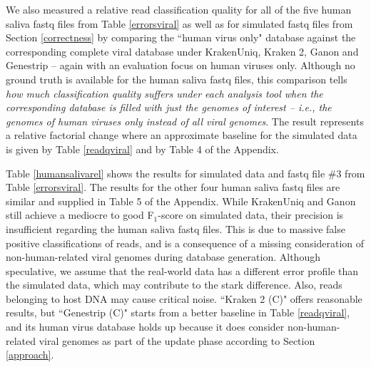 \documentclass[pdflatex,sn-vancouver-num]{sn-jnl}
\begin{document}
    We also measured a relative read classification quality for all of the five human saliva fastq files from Table \ref{errorsviral} as well as for simulated fastq files from Section \ref{correctness} by comparing the ``human virus only" database against the corresponding complete viral database under KrakenUniq, Kraken 2, Ganon and Genestrip -- again with an evaluation focus on human viruses only.
    Although no ground truth is available for the human saliva fastq files, this comparison tells \emph{how much classification quality suffers under each analysis tool when the corresponding database is filled with just the genomes of interest -- i.e., the genomes of human viruses only instead of all viral genomes}. The result represents a relative factorial change where an approximate baseline for the simulated data is given by Table \ref{readqviral} and by Table 4 %
    of the Appendix.
    
    Table \ref{humansalivarel} shows the results for simulated data and fastq file \#3 from Table \ref{errorsviral}. The results for the other four human saliva fastq files are similar and supplied in Table 5 %
    of the Appendix.  While KrakenUniq and Ganon still achieve a mediocre to good F$_1$-score on simulated data, their precision is insufficient regarding the human saliva fastq files. This is due to massive false positive classifications of reads, and is a consequence of a missing consideration of non-human-related viral genomes during database generation. Although speculative, we assume that the real-world data has a different error profile than the simulated data, which may contribute to the stark difference. Also, reads belonging to host DNA may cause critical noise. ``Kraken 2 (C)" offers reasonable results, but ``Genestrip (C)" starts from a better baseline in Table \ref{readqviral}, and its human virus database holds up because it does consider non-human-related viral genomes as part of the update phase according to Section \ref{approach}.
        
\end{document}
